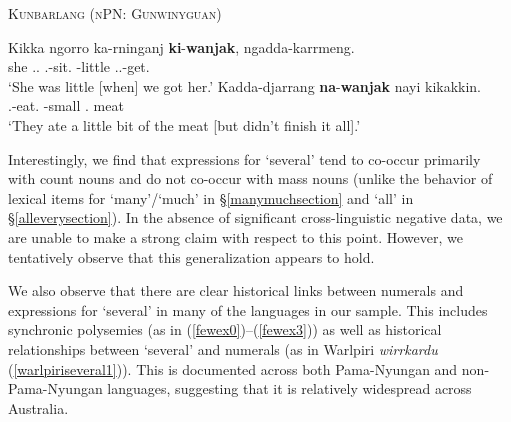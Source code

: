 \documentclass[12pt,egregdoesnotlikesansseriftitles]{scrartcl}
\begin{document}
\begin{exe}
  \ex\label{ex:lil} \textsc{Kunbarlang (nPN: Gunwinyguan)} \hfill \citep[276, 133]{ikthesis}
  \begin{xlist}
    \ex \gll Kikka ngorro ka-rninganj \textbf{ki}-\textbf{wanjak}, ngadda-karrmeng.\\
    she \Dem.\Med.\Cliv{} \Tsg.\Real-sit.\Pst{} \Clii-little \Fpl.\Excl.\Real-get.\Pst\\
    \glt `She was little [when] we got her.' %
    \ex \gll Kadda-djarrang \textbf{na}-\textbf{wanjak} nayi kikakkin.\\
    \Tpl.\Nfut-eat.\Pst{} \Cli-small \Nm.\Cli{} meat\\
    \glt `They ate a little bit of the meat [but didn't finish it all].' %
  \end{xlist}
\end{exe}

Interestingly, we find that expressions for `several' tend to co-occur primarily with count nouns and do not co-occur with mass nouns (unlike the behavior of lexical items for `many'/`much' in \S\ref{manymuchsection} and `all' in \S\ref{alleverysection}). In the absence of significant cross-linguistic negative data, we are unable to make a strong claim with respect to this point. However, we tentatively observe that this generalization appears to hold.


We also observe that there are clear historical links between numerals and expressions for `several' in many of the languages in our sample. This includes synchronic polysemies (as in (\ref{fewex0})--(\ref{fewex3})) as well as historical relationships between `several' and numerals (as in Warlpiri \textit{wirrkardu} (\ref{warlpiriseveral1})). This is documented across both Pama-Nyungan and non-Pama-Nyungan languages, suggesting that it is relatively widespread across Australia.
\end{document}

